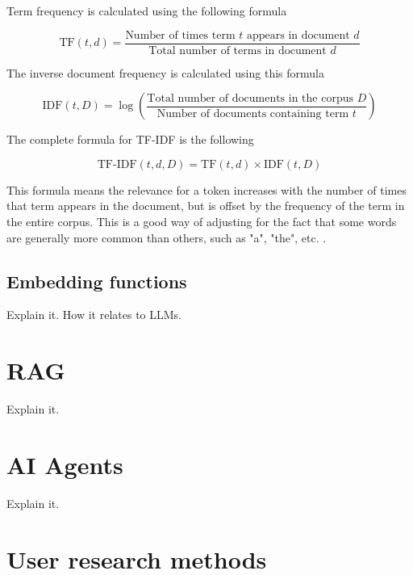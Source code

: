Term frequency is calculated using the following formula


\begin{equation}
        \text{TF}(t, d) = \frac{\text{Number of times term } t \text{ appears in document } d}{\text{Total number of terms in document } d}
\end{equation}

The inverse document frequency is calculated using this formula


\begin{equation}
        \text{IDF}(t, D) = \log \left(\frac{\text{Total number of documents in the corpus } D}{\text{Number of documents containing term } t}\right)
\end{equation}

The complete formula for TF-IDF is the following


\begin{equation}
        \text{TF-IDF}(t, d, D) = \text{TF}(t, d) \times \text{IDF}(t, D)
\end{equation}


This formula means the relevance for a token increases with the number of times that term appears in the document, but is offset by the frequency of the term in the entire corpus. This is a good way of adjusting for the fact that some words are generally more common than others, such as "a", "the", etc. \cite{christopher_d_introduction_2008}.


\subsection{Embedding functions}


Explain it. How it relates to LLMs.






\section{RAG}


Explain it.


\section{AI Agents}


Explain it.


\section{User research methods}


